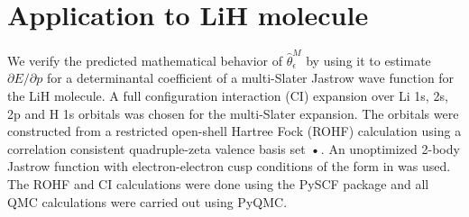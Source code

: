 \documentclass[twocolumn]{revtex4-1}
\begin{document}
\section{Application to LiH molecule}
We verify the predicted mathematical behavior of $\hat{\theta}_\epsilon^M$ by using it to estimate $\partial E/\partial p$ for a determinantal coefficient of a multi-Slater Jastrow wave function for the LiH molecule.
A full configuration interaction (CI) expansion over Li 1s, 2s, 2p and H 1s orbitals was chosen for the multi-Slater expansion.
The orbitals were constructed from a restricted open-shell Hartree Fock (ROHF) calculation using a correlation consistent quadruple-zeta valence basis set \cite{doi:10.1063/1.456153}\textbf{•}.
An unoptimized 2-body Jastrow function with electron-electron cusp conditions of the form in \cite{Wagner2009} was used.
The ROHF and CI calculations were done using the PySCF package \cite{PYSCF} and all QMC calculations were carried out using PyQMC.
\end{document}
